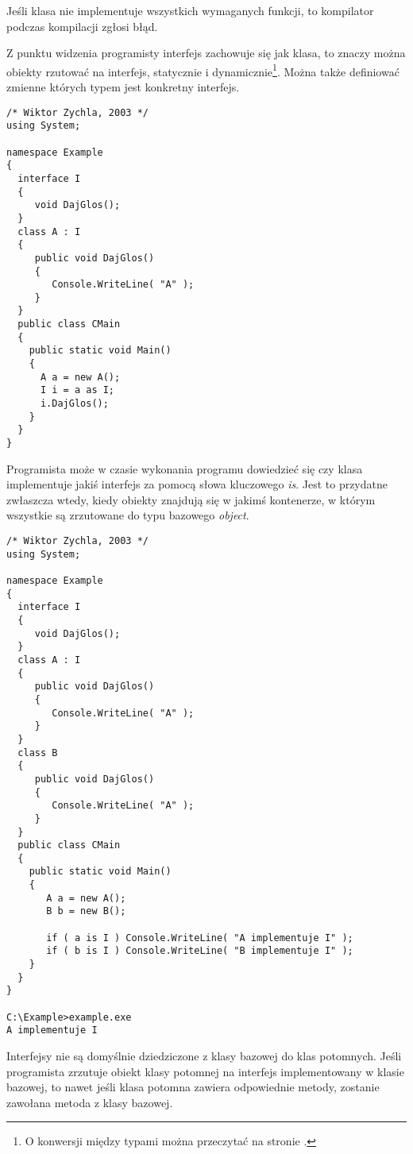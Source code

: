 Jeśli klasa nie implementuje wszystkich wymaganych funkcji, to kompilator podczas kompilacji zgłosi błąd.

Z punktu widzenia programisty interfejs zachowuje się jak klasa, to znaczy można obiekty rzutować
na interfejs, statycznie i dynamicznie\footnote{O konwersji między typami można przeczytać na stronie
\pageref{KonwersjeMiedzyTypami}.}. Można także definiować zmienne których typem jest konkretny interfejs.

\begin{scriptsize}
\begin{verbatim}
/* Wiktor Zychla, 2003 */
using System;

namespace Example
{
  interface I
  {
     void DajGlos();
  }
  class A : I
  {
     public void DajGlos()
     {
        Console.WriteLine( "A" );
     }
  }
  public class CMain
  {    
    public static void Main()
    {
      A a = new A();
      I i = a as I;
      i.DajGlos();
    }
  }
}
\end{verbatim}
\end{scriptsize}

Programista może w czasie wykonania programu dowiedzieć się czy klasa implementuje jakiś interfejs
za pomocą słowa kluczowego {\em is}. Jest to przydatne zwłaszcza wtedy, kiedy obiekty znajdują się w jakimś
kontenerze, w którym wszystkie są zrzutowane do typu bazowego {\em object}.

\begin{scriptsize}
\begin{verbatim}
/* Wiktor Zychla, 2003 */
using System;

namespace Example
{
  interface I
  {
     void DajGlos();
  }
  class A : I
  {
     public void DajGlos()
     {
        Console.WriteLine( "A" );
     }
  }
  class B 
  {
     public void DajGlos()
     {
        Console.WriteLine( "A" );
     }
  }
  public class CMain
  {    
    public static void Main()
    {
       A a = new A();
       B b = new B();

       if ( a is I ) Console.WriteLine( "A implementuje I" );
       if ( b is I ) Console.WriteLine( "B implementuje I" );
    }
  }
}

C:\Example>example.exe
A implementuje I
\end{verbatim}
\end{scriptsize}

Interfejsy nie są domyślnie dziedziczone z klasy bazowej do klas potomnych. Jeśli programista 
zrzutuje obiekt klasy potomnej na interfejs implementowany w klasie bazowej, to nawet jeśli klasa
potomna zawiera odpowiednie metody, zostanie zawołana metoda z klasy bazowej. 

